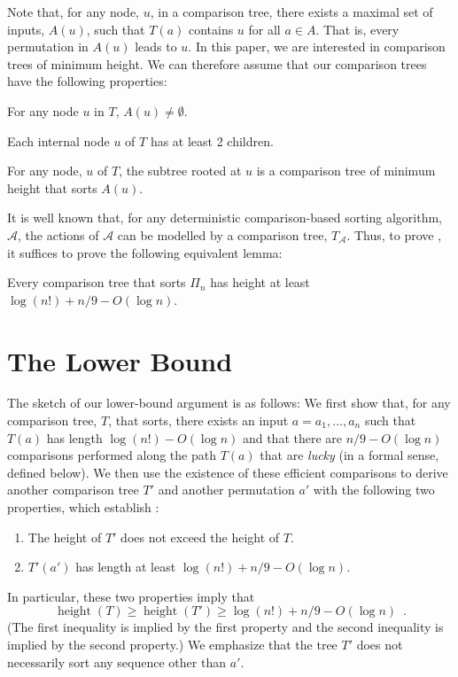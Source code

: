 \documentclass{patmorin}
\DeclareMathOperator{\height}{height}
\begin{document}
Note that, for any node, $u$, in a comparison tree, there exists a maximal
set of inputs, $A(u)$, such that $T(a)$ contains $u$ for all $a\in A$.
That is, every permutation in $A(u)$ leads to $u$.  In this paper, we
are interested in comparison trees of minimum height. We can therefore
assume that our comparison trees have the following properties:

\begin{prp}
  For any node $u$ in $T$, $A(u)\neq\emptyset$.
\end{prp}

\begin{prp}
  Each internal node $u$ of $T$ has at least 2 children.
\end{prp}

\begin{prp}
  For any node, $u$ of $T$, the subtree rooted at $u$ is a comparison tree
  of minimum height that sorts $A(u)$. 
\end{prp}

It is well known that, for any deterministic comparison-based sorting
algorithm, $\mathcal{A}$, the actions of $\mathcal{A}$ can be modelled by
a comparison tree, $T_\mathcal{A}$.  Thus, to prove ,
it suffices to prove the following equivalent lemma:

\begin{lem}
  Every comparison tree that sorts $\Pi_n$ has height at least
  $\log(n!)+n/9-O(\log n)$.
\end{lem}

\section{The Lower Bound}

The sketch of our lower-bound argument is as follows:  We first show
that, for any comparison tree, $T$, that sorts, there exists an input
$a=a_1,\ldots,a_n$ such that $T(a)$ has length $\log(n!)-O(\log n)$ and
that there are $n/9-O(\log n)$ comparisons performed along the path $T(a)$
that are \emph{lucky} (in a formal sense, defined below).  We then use
the existence of these efficient comparisons to derive another comparison
tree $T'$ and another permutation $a'$ with the following two properties,
which establish :
\begin{enumerate}
  \item The height of $T'$ does not exceed the height of $T$.
  \item $T'(a')$ has length at least $\log(n!)+n/9-O(\log n)$.
\end{enumerate}
In particular, these two properties imply that
\[
   \height(T) \ge \height(T') \ge \log(n!)+n/9-O(\log n) \enspace .
\]
(The first inequality is implied by the first property and the second
inequality is implied by the second property.)  We emphasize that the
tree $T'$ does not necessarily sort any sequence other than $a'$.
\end{document}
